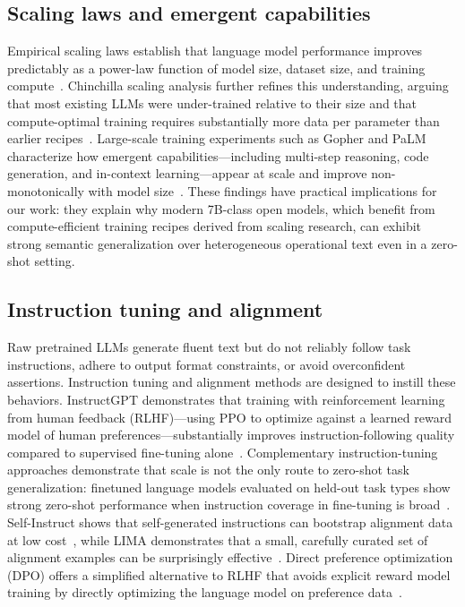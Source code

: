 \subsection{Scaling laws and emergent capabilities}

Empirical scaling laws establish that language model performance improves predictably as a
power-law function of model size, dataset size, and training
compute~\cite{kaplan2020scalinglawsneurallanguage}. Chinchilla scaling analysis further refines
this understanding, arguing that most existing LLMs were under-trained relative to their size and
that compute-optimal training requires substantially more data per parameter than earlier
recipes~\cite{hoffmann2022trainingcomputeoptimallargelanguage}. Large-scale training experiments
such as Gopher and PaLM characterize how emergent capabilities---including multi-step reasoning,
code generation, and in-context learning---appear at scale and improve non-monotonically with
model size~\cite{rae2022scalinglanguagemodelsmethods,chowdhery2022palmscalinglanguagemodeling}.
These findings have practical implications for our work: they explain why modern 7B-class open
models, which benefit from compute-efficient training recipes derived from scaling research, can
exhibit strong semantic generalization over heterogeneous operational text even in a zero-shot
setting.

\subsection{Instruction tuning and alignment}

Raw pretrained LLMs generate fluent text but do not reliably follow task instructions, adhere to
output format constraints, or avoid overconfident assertions. Instruction tuning and alignment
methods are designed to instill these behaviors. InstructGPT demonstrates that training with
reinforcement learning from human feedback (RLHF)---using PPO to optimize against a learned
reward model of human preferences---substantially improves instruction-following quality compared
to supervised fine-tuning
alone~\cite{ouyang2022traininglanguagemodelsfollow,schulman2017proximalpolicyoptimizationalgorithms}.
Complementary instruction-tuning approaches demonstrate that scale is not the only route to
zero-shot task generalization: finetuned language models evaluated on held-out task types show
strong zero-shot performance when instruction coverage in fine-tuning is
broad~\cite{wei2022finetunedlanguagemodelszeroshot}. Self-Instruct shows that self-generated
instructions can bootstrap alignment data at low cost~\cite{wang2023selfinstructaligninglanguagemodels},
while LIMA demonstrates that a small, carefully curated set of alignment examples can be
surprisingly effective~\cite{zhou2023limaalignment}. Direct preference optimization (DPO) offers
a simplified alternative to RLHF that avoids explicit reward model training by directly optimizing
the language model on preference
data~\cite{rafailov2024directpreferenceoptimizationlanguage}.

